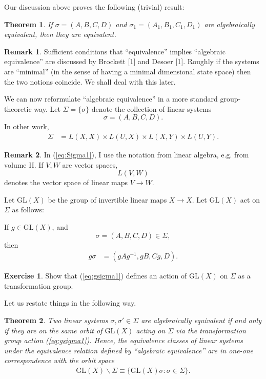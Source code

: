 \documentclass[12pt]{book}
\theoremstyle{plain}
\newtheorem{theorem}{Theorem}[section]
\theoremstyle{definition}
\newtheorem{exercise}{Exercise}[section]
\newtheorem*{remark}{Remark}
\begin{document}
Our discussion above proves the following (trivial) result:
\begin{theorem}
If $\sigma = (A, B, C, D)$ and $\sigma_1 = (A_1, B_1, C_1, D_1)$ are algebraically equivalent, then they are equivalent.
\end{theorem}

\begin{remark}
    Sufficient conditions that ``equivalence'' implies ``algebraic equivalence'' are discussed by Brockett [1] and Desoer [1]. %
    Roughly if the systems are ``minimal'' (in the sense of having a minimal dimensional state space) then the two notions coincide.
    We shall deal with this later.
\end{remark}

We can now reformulate ``algebraic equivalence'' in a more standard group-theoretic way.
Let $\Sigma = \{\sigma\}$ denote the collection of linear systems
$$\sigma = (A, B, C, D).$$
In other work, %
\begin{align} \label{eq:Sigma1}
    \Sigma &= L(X, X) \times L(U, X) \times L(X, Y) \times L(U, Y).
\end{align}

\begin{remark}
    In (\ref{eq:Sigma1}), I use the notation from linear algebra, e.g. from volume II. If $V, W$ are vector spaces,
    $$L(V, W)$$
    denotes the vector space of linear maps $V \to W$.
\end{remark}

Let $\mathrm{GL}(X)$ be the group of invertible linear maps $X \to X$.
Let $\mathrm{GL}(X)$ act on $\Sigma$ as follows:

If $g \in \mathrm{GL}(X)$, and
$$\sigma = (A, B, C, D) \in \Sigma,$$
then
\begin{align} \label{eq:gsigma1}
    g\sigma &= (gAg^{-1}, gB, Cg, D).
\end{align}

\begin{exercise}
Show that (\ref{eq:gsigma1}) defines an action of $\mathrm{GL}(X)$ on $\Sigma$ as a transformation group.
\end{exercise}

Let us restate things in the following way.

\begin{theorem}
    Two linear systems $\sigma, \sigma' \in \Sigma$ are algebraically equivalent if and only if they are on the same orbit of $\mathrm{GL}(X)$ acting on $\Sigma$ via the transformation group action (\ref{eq:gsigma1}).
    Hence, the equivalence classes of linear systems under the equivalence relation defined by ``algebraic equivalence'' are in one-one correspondence with the orbit space
    \begin{align} \label{eq:OrbitSpace1}
        \mathrm{GL}(X)\backslash\Sigma \equiv \{\mathrm{GL}(X)\sigma : \sigma \in \Sigma\}.
    \end{align}
\end{theorem}
\end{document}
